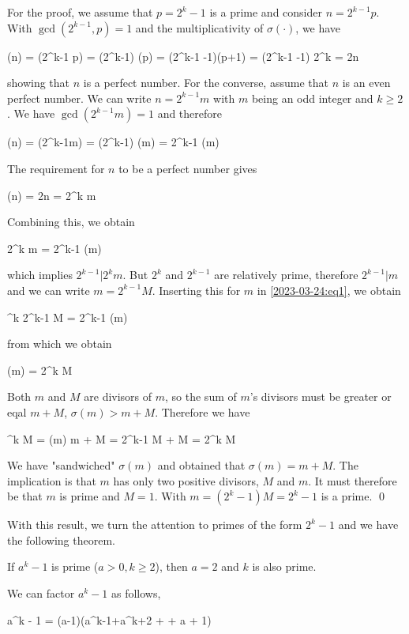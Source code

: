 For the proof, we assume that $p=2^k-1$ is a prime and consider $n = 2^{k-1} p$. With $\gcd(2^{k-1},p) = 1$ and the multiplicativity of $\sigma(\cdot)$, we have

\bee
\sigma(n) = \sigma(2^{k-1} p) = \sigma(2^{k-1}) \sigma(p) = (2^{k-1} -1)(p+1) = (2^{k-1} -1) 2^k = 2n
\eee

showing that $n$ is a perfect number. For the converse, assume that $n$ is an even perfect number. We can write $n = 2^{k-1}m$ with $m$ being an odd integer and $k \geq 2$. We have $\gcd(2^{k-1}m) = 1$ and therefore

\bee
\sigma(n) = \sigma(2^{k-1}m) = \sigma(2^{k-1}) \sigma(m) = 2^{k-1} \sigma(m)
\eee

The requirement for $n$ to be a perfect number gives

\bee
\sigma(n) = 2n = 2^k m
\eee

Combining this, we obtain

\be\label{2023-03-24:eq1}
2^k m = 2^{k-1} \sigma(m)
\ee

which implies $2^{k-1} | 2^k m$. But $2^k$ and $2^{k-1}$ are relatively prime, therefore $2^{k-1} | m$ and we can write $m = 2^{k-1} M$. Inserting this for $m$ in \eqref{2023-03-24:eq1}, we obtain

^k 2^{k-1} M = 2^{k-1} \sigma(m)
\eee

from which we obtain

\bee
\sigma(m) = 2^k M
\eee

Both $m$ and $M$ are divisors of $m$, so the sum of $m$'s divisors must be greater or eqal $m + M$, $\sigma(m) > m + M$. Therefore we have

^k M = \sigma(m) \geq m + M = 2^{k-1} M + M = 2^k M
\eee

We have "sandwiched" $\sigma(m)$ and obtained that $\sigma(m) = m + M$. The implication is that $m$ has only two positive divisors, $M$ and $m$. It must therefore be that $m$ is prime and $M=1$. With $m = (2^k-1)M = 2^k-1$ is a prime. \qed

With this result, we turn the attention to primes of the form $2^k-1$ and we have the following theorem.

\begin{theorem}
    If $a^k-1$ is prime  ($a > 0, k \geq 2$), then $a=2$ and $k$ is also prime.
\end{theorem}

We can factor $a^k-1$ as follows,

\be\label{2023-03-24:eq2}
a^k - 1 = (a-1)(a^{k-1}+a^{k+2} + \cdots + a + 1)
\ee

